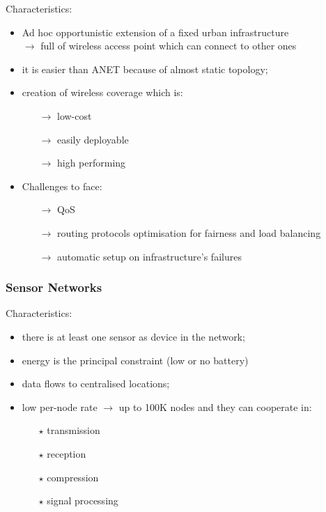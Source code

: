Characteristics:
\begin{itemize}
    \item Ad hoc opportunistic extension of a fixed urban infrastructure\\
    $\rightarrow$ full of wireless access point which can connect to other
    ones
    \item it is easier than ANET because of almost static topology;
    \item creation of wireless coverage which is:
    \begin{itemize}
        \item[$\rightarrow$] low-cost
        \item[$\rightarrow$] easily deployable
        \item[$\rightarrow$] high performing
    \end{itemize}
    \item Challenges to face:
    \begin{itemize}
        \item[$\rightarrow$] QoS
        \item[$\rightarrow$] routing protocols optimisation for fairness and load balancing
        \item[$\rightarrow$] automatic setup on infrastructure's failures
    \end{itemize}
\end{itemize}

\subsubsection{Sensor Networks}

Characteristics:
\begin{itemize}
    \item there is at least one sensor as device in the network;
    \item energy is the principal constraint (low or no battery)
    \item data flows to centralised locations;
    \item low per-node rate $\rightarrow$ up to 100K nodes
    and they can cooperate in:
    \begin{itemize}
        \item[$\star$] transmission
        \item[$\star$] reception
        \item[$\star$] compression
        \item[$\star$] signal processing
    \end{itemize}
\end{itemize}


